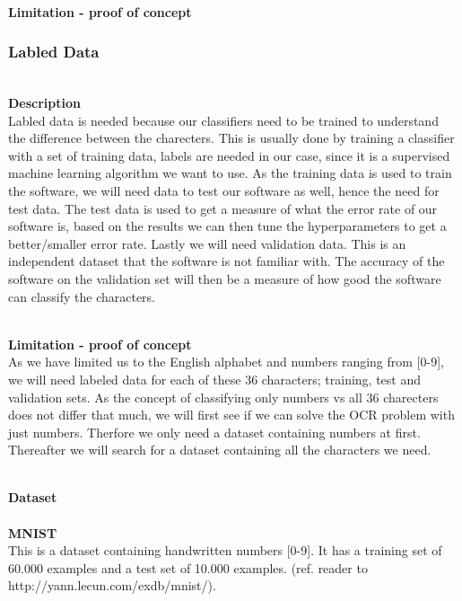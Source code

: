 \documentclass[11pt,a4paper,english]{article}
\begin{document}
\noindent \\ \textbf{Limitation - proof of concept}


\subsubsection{Labled Data}
\noindent \\ \textbf{Description}
\noindent \\
Labled data is needed because our classifiers need to be trained to understand
the difference between the charecters. This is usually done by training a
classifier with a set of training data, labels are needed in our case,
since it is a supervised machine learning algorithm we want to use. As the
training data is used to train the software, we will need data to test our
software as well, hence the need for test data. The test data is used to get a
measure of what the error rate of our software is, based on the results we
can then tune the hyperparameters to get a better/smaller error rate. Lastly
we will need validation data. This is an independent dataset that the software
is not familiar with. The accuracy of the software on the validation set will
then be a measure of how good the software can classify the characters.

\noindent \\ \textbf{Limitation - proof of concept}
\noindent \\
As we have limited us to the English alphabet and numbers ranging from [0-9],
we will need labeled data for each of these 36 characters; training, test and
validation sets. As the concept of classifying only numbers vs all 36
charecters does not differ that much, we will first see if we can solve the OCR
problem with just numbers. Therfore we only need a dataset containing numbers
at first. Thereafter we will search for a dataset containing all the characters
we need.

\noindent \\ \textbf{Dataset}
\noindent \\
\noindent \\ \textbf{MNIST}
\noindent \\ This is a dataset containing handwritten numbers [0-9].
It has a training set of 60.000 examples and a test set of 10.000 examples.
(ref. reader to http://yann.lecun.com/exdb/mnist/).
\end{document}
